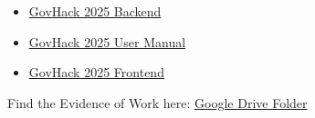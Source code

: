 

\begin{itemize}
    \item \href{https://github.com/AyeshJayasekara/GovHack-2025-Backend}{GovHack 2025 Backend}
    \item \href{https://github.com/AyeshJayasekara/GovHack-2025-User-Manual}{GovHack 2025 User Manual}
    \item \href{https://github.com/AyeshJayasekara/GovHack-2025-Frontend}{GovHack 2025 Frontend}

\end{itemize}


Find the Evidence of Work here: \href{https://drive.google.com/drive/folders/1xzcWyqNB2IROk3geRsKg1ZAeuT4ctJjO?usp=share_link}{Google Drive Folder}









